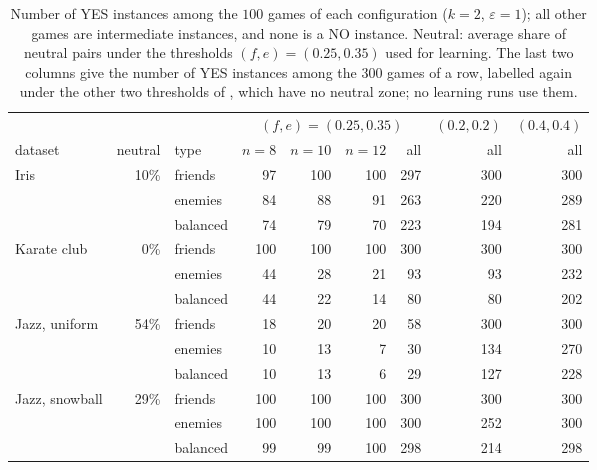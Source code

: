 \begin{table}[!htbp]
\centering
\caption{Number of YES instances among the $100$ games of each configuration ($k=2$, $\varepsilon=1$); all other games are intermediate instances, and none is a NO instance. Neutral: average share of neutral pairs under the thresholds $(f,e)=(0.25,0.35)$ used for learning. The last two columns give the number of YES instances among the $300$ games of a row, labelled again under the other two thresholds of \citet{csaji2025clustering}, which have no neutral zone; no learning runs use them.}
\label{tab:bench-labels}
\small
\begin{tabular}{lrl rrr r rr}
\toprule
 & & & \multicolumn{4}{c}{$(f,e)=(0.25,0.35)$} & $(0.2,0.2)$ & $(0.4,0.4)$ \\
\cmidrule(lr){4-7}\cmidrule(lr){8-8}\cmidrule(lr){9-9}
dataset & neutral & type & $n=8$ & $n=10$ & $n=12$ & all & all & all \\
\midrule
Iris & 10\% & friends & 97 & 100 & 100 & 297 & 300 & 300 \\
 &  & enemies & 84 & 88 & 91 & 263 & 220 & 289 \\
 &  & balanced & 74 & 79 & 70 & 223 & 194 & 281 \\
\midrule
Karate club & 0\% & friends & 100 & 100 & 100 & 300 & 300 & 300 \\
 &  & enemies & 44 & 28 & 21 & 93 & 93 & 232 \\
 &  & balanced & 44 & 22 & 14 & 80 & 80 & 202 \\
\midrule
Jazz, uniform & 54\% & friends & 18 & 20 & 20 & 58 & 300 & 300 \\
 &  & enemies & 10 & 13 & 7 & 30 & 134 & 270 \\
 &  & balanced & 10 & 13 & 6 & 29 & 127 & 228 \\
\midrule
Jazz, snowball & 29\% & friends & 100 & 100 & 100 & 300 & 300 & 300 \\
 &  & enemies & 100 & 100 & 100 & 300 & 252 & 300 \\
 &  & balanced & 99 & 99 & 100 & 298 & 214 & 298 \\
\bottomrule
\end{tabular}
\end{table}
